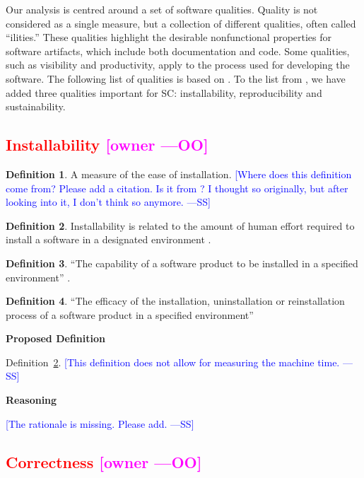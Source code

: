\documentclass[letterpaper,cleveref]{lipics-v2019}
\newcommand{\authornote}[3]{\textcolor{#1}{[#3 ---#2]}}
\newcommand{\authornote}[3]{}
\newcommand{\wss}[1]{\authornote{blue}{SS}{#1}} %
\newcommand{\oo}[1]{\authornote{magenta}{OO}{#1}} %
\newcommand{\notdone}[1]{\textcolor{red}{#1}}
\theoremstyle{definition}
\newtheorem{defn}{Definition}
\begin{document}
Our analysis is centred around a set of software qualities.  Quality is not
considered as a single measure, but a collection of different qualities, often
called ``ilities.''  These qualities highlight the desirable nonfunctional
properties for software artifacts, which include both documentation and
code. Some qualities, such as visibility and productivity, apply to the process
used for developing the software. The following list of qualities is based on
\cite{GhezziEtAl2003}. To the list from \cite{GhezziEtAl2003}, we have added
three qualities important for SC: installability, reproducibility and
sustainability.

\subsection{\notdone{Installability} \oo{owner}}

\begin{defn}
  A measure of the ease of installation.  \wss{Where does this definition come
    from? Please add a citation.  Is it from \citet{McCallEtAl1977}?  I thought
    so originally, but after looking into it, I don't think so anymore.}
\end{defn}

\begin{defn} \label{DefnInstallability}
  Installability is related to the amount of human effort required to install a
  software in a designated environment \citep{berander2005software}.
\end{defn}

\begin{defn}
  ``The capability of a software product to be installed in a specified
  environment'' \citep{berander2005software}.
\end{defn}

\begin{defn}
  ``The efficacy of the installation, uninstallation or reinstallation process
  of a software product in a specified environment'' \citep{iso201017043}
\end{defn}

\noindent \textbf{Proposed Definition}

Definition~\ref{DefnInstallability}.  \wss{This definition does not allow for
  measuring the machine time.}

\noindent \textbf{Reasoning}

\wss{The rationale is missing.  Please add.}

\subsection{\notdone{Correctness} \oo{owner}}
\end{document}

